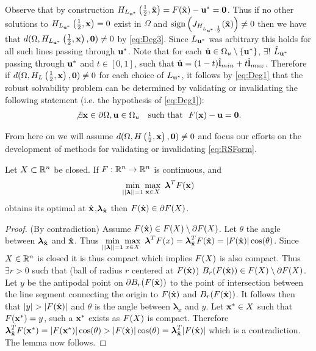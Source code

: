 Observe that by construction $H_{L_{\mathbf{u}^*}}\left(\frac{1}{2},\hat{\mathbf{x}}\right)=F(\hat{\mathbf{x}})-\mathbf{u}^*=\textbf{0}$. 
Thus if no other solutions to $H_{L_{\mathbf{u}^*}}\left(\frac{1}{2},\mathbf{x}\right)=0$ exist in $\Omega$ and $\operatorname{sign}\left(J_{H_{L_{\mathbf{u}^*},\frac{1}{2}}}(\hat{\mathbf{x}})\right)\neq 0$ then we have that $d(\Omega,H_{L_{\mathbf{u}^*}}\left(\frac{1}{2},\mathbf{x}\right),\textbf{0})\neq 0$ by \ref{eq:Deg3}. 
Since $L_{\mathbf{u}^*}$ was arbitrary this holds for all such lines passing through $\mathbf{u}^*$.
Note that for each $\hat{\mathbf{u}}\in\Omega_u\setminus\{\mathbf{u}^*\}$, $\exists !$ $\hat{L}_{\mathbf{u}^*}$ passing through $\mathbf{u}^*$ and $t\in[0,1]$,  such that $\hat{\mathbf{u}}=(1-t)\hat{\mathbf{l}}_{min}+t\hat{\mathbf{l}}_{max}$. 
Therefore if $d(\Omega,H_L\left(\frac{1}{2},\mathbf{x}\right),\mathbf{0})\neq 0$ for each choice of $L_{\mathbf{u}^*}$, it follows by \ref{eq:Deg1} that the robust solvability problem can be determined by validating or invalidating the following statement (i.e. the hypothesis of \ref{eq:Deg1}):
\begin{align}
\not\exists \mathbf{x}\in\partial\Omega, \mathbf{u}\in\Omega_u \ \ \mbox{ such that } \ F(\mathbf{x})-\mathbf{u}=\mathbf{0}. \label{eq:RSForm}
\end{align}

From here on we will assume $d(\Omega,H\left(\frac{1}{2},\mathbf{x}\right),\mathbf{0})\neq 0$ and focus our efforts on the development of methods for validating or invalidating \ref{eq:RSForm}.

\begin{lem} 
\label{lem:BdOpt}
Let $X\subset\mathbb{R}^n$ be closed. If $F:\mathbb{R}^n\rightarrow\mathbb{R}^n$ is continuous, and 
$$\min\limits_{||\boldsymbol{\lambda}||=1}\max\limits_{\mathbf{x}\in X}\ \boldsymbol{\lambda}^TF(\mathbf{x})$$
obtains its optimal at $\hat{\mathbf{x}}$,$\boldsymbol{\lambda}_{\hat{\mathbf{x}}}$ then $F(\hat{\mathbf{x}})\in \partial F(X)$. 


\begin{proof} 
(By contradiction) Assume $F(\hat{\mathbf{x}})\in F(X)\setminus\partial F(X)$. 
Let $\theta$ the angle between $\boldsymbol{\lambda}_{\hat{\mathbf{x}}}$ and $\hat{\mathbf{x}}$. 
Thus $\min\limits_{||\boldsymbol{\lambda}||=1}\max\limits_{x\in X}\ \boldsymbol{\lambda}^T\vF(x)=\boldsymbol{\lambda}_{\hat{\vx}}^T\vF(\hat{\vx})=|\vF(\hat{\vx})|\cos(\theta)$. 
Since $X\in\mathbb{R}^n$ is closed it is thus compact which implies $F(X)$ is also compact. 
Thus $\exists r>0$ such that (ball of radius $r$ centered at $F(\hat{\mathbf{x}})$) $B_r(F(\hat{\mathbf{x}}))\in F(X)\setminus\partial F(X)$. 
Let $y$ be the antipodal point on $\partial B_r(F(\hat{\mathbf{x}}))$ to the point of intersection between the line segment connecting the origin to $F(\hat{\mathbf{x}})$ and $B_r(F(\hat{\mathbf{x}}))$. 
It follows then that $|y|>|\vF(\hat{\vx})|$ and $\theta$ is the angle between $\boldsymbol{\lambda}_x$ and $y$.   
Let $\mathbf{x}^*\in X$ such that $F(\mathbf{x}^*)=y$, such a $\mathbf{x}^*$ exists as $F(X)$ is compact. 
Therefore $\boldsymbol{\lambda}_{\hat{\mathbf{x}}}^TF(\mathbf{x}^*)=|F(\mathbf{x}^*)|\cos(\theta)>|F(\hat{\mathbf{x}})|\cos(\theta)=\boldsymbol{\lambda}_{\hat{\mathbf{x}}}^T|F(\hat{\mathbf{x}})|$ which is a contradiction. 
The lemma now follows.
\end{proof}
\end{lem}

